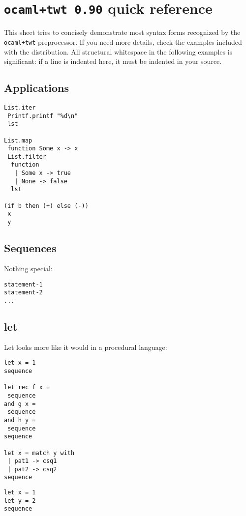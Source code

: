 \documentclass{article}
\begin{document}
\pagestyle{empty}

\setlength{\columnseprule}{1pt}
\twocolumn
\section*{{\tt ocaml+twt 0.90} quick reference}
\noindent This sheet tries to concisely demonstrate most syntax forms recognized by the {\tt ocaml+twt} preprocessor. If you need more details, check the examples included with the distribution. All structural whitespace in the following examples is significant: if a line is indented here, it must be indented in your source.

\subsection*{Applications}

\begin{verbatim}
List.iter
 Printf.printf "%d\n"
 lst

List.map
 function Some x -> x
 List.filter
  function
   | Some x -> true
   | None -> false
  lst

(if b then (+) else (-))
 x
 y
\end{verbatim}

\subsection*{Sequences}

Nothing special:

\begin{verbatim}
statement-1
statement-2
...
\end{verbatim}

\subsection*{let}

\noindent Let looks more like it would in a procedural language:

\begin{verbatim}
let x = 1
sequence

let rec f x =
 sequence
and g x =
 sequence
and h y =
 sequence
sequence

let x = match y with
 | pat1 -> csq1
 | pat2 -> csq2
sequence
\end{verbatim}

\begin{verbatim}
let x = 1
let y = 2
sequence
\end{verbatim}
\end{document}
